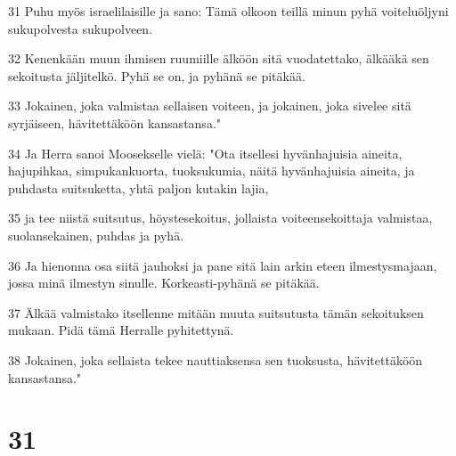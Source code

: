 \par 31 Puhu myös israelilaisille ja sano: Tämä olkoon teillä minun pyhä voiteluöljyni sukupolvesta sukupolveen.
\par 32 Kenenkään muun ihmisen ruumiille älköön sitä vuodatettako, älkääkä sen sekoitusta jäljitelkö. Pyhä se on, ja pyhänä se pitäkää.
\par 33 Jokainen, joka valmistaa sellaisen voiteen, ja jokainen, joka sivelee sitä syrjäiseen, hävitettäköön kansastansa."
\par 34 Ja Herra sanoi Moosekselle vielä: "Ota itsellesi hyvänhajuisia aineita, hajupihkaa, simpukankuorta, tuoksukumia, näitä hyvänhajuisia aineita, ja puhdasta suitsuketta, yhtä paljon kutakin lajia,
\par 35 ja tee niistä suitsutus, höystesekoitus, jollaista voiteensekoittaja valmistaa, suolansekainen, puhdas ja pyhä.
\par 36 Ja hienonna osa siitä jauhoksi ja pane sitä lain arkin eteen ilmestysmajaan, jossa minä ilmestyn sinulle. Korkeasti-pyhänä se pitäkää.
\par 37 Älkää valmistako itsellenne mitään muuta suitsutusta tämän sekoituksen mukaan. Pidä tämä Herralle pyhitettynä.
\par 38 Jokainen, joka sellaista tekee nauttiaksensa sen tuoksusta, hävitettäköön kansastansa."

\chapter{31}

